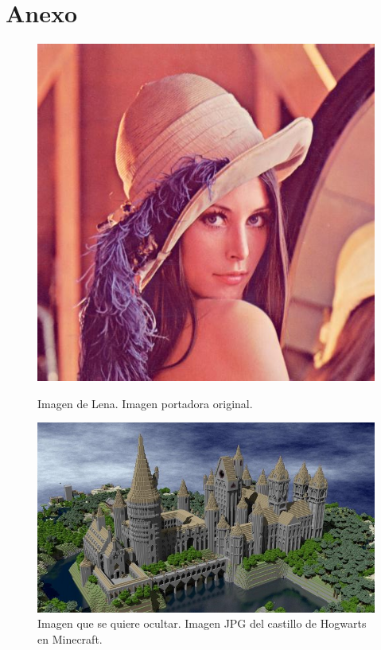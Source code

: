\documentclass[a4paper,10pt]{article}
\begin{document}
\clearpage
\appendix
\section{Anexo}

\begin{figure}[!htb]
    \includegraphics[scale=0.48]{./images/lenacolor.jpg}
    \caption{Imagen de Lena. Imagen portadora original.}\label{fig:awesome_image1}
\endminipage\hfill
{}
    \includegraphics[scale=0.3]{./images/hogwarts.jpg}
    \caption{Imagen que se quiere ocultar. Imagen JPG del castillo de Hogwarts en Minecraft.}\label{fig:awesome_image2}
\endminipage\hfill
\end{figure}
\end{document}
